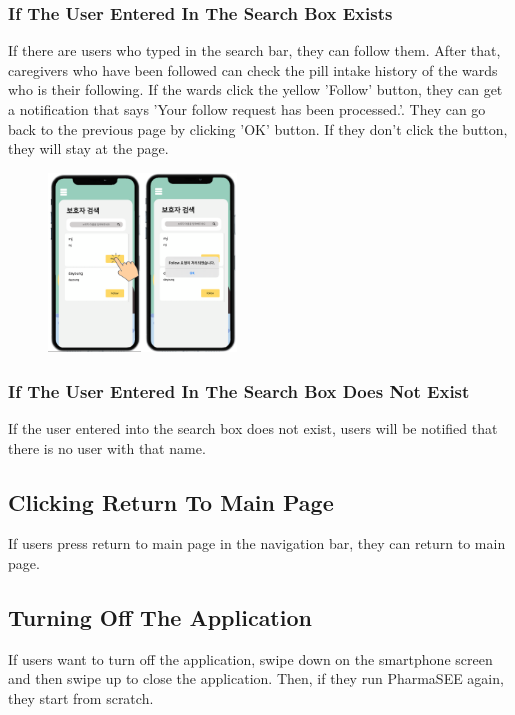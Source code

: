 \documentclass[conference]{IEEEtran}
\begin{document}
\subsubsection{If The User Entered In The Search Box Exists}
If there are users who typed in the search bar, they can follow them. After that, caregivers who have been followed can check the pill intake history of the wards who is their following. If the wards click the yellow 'Follow' button, they can get a notification that says 'Your follow request has been processed.'. They can go back to the previous page by clicking 'OK' button. If they don't click the button, they will stay at the page.\\

\begin{figure}[h!]
\centering
\includegraphics[width=5cm]{final_image_folder/click_bohoja_follow.png}
\caption{}
\label{fig:map}
\end{figure}

\subsubsection{If The User Entered In The Search Box Does Not Exist}
If the user entered into the search box does not exist, users will be notified that there is no user with that name.\\

\subsection{Clicking Return To Main Page} 
If users press return to main page in the navigation bar, they can return to main page.\\

\subsection{Turning Off The Application}
If users want to turn off the application, swipe down on the smartphone screen and then swipe up to close the application. Then, if they run PharmaSEE again, they start from scratch.\\
\end{document}
